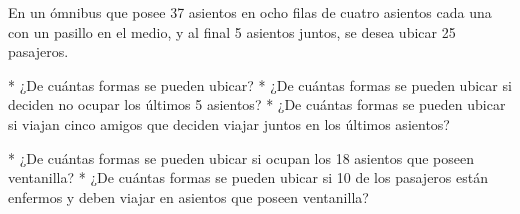 \documentclass[]{presentacion}
\begin{document}
\begin{frame}[allowframebreaks]

\begin{problema}[1]
  En un ómnibus que posee 37 asientos en ocho filas de cuatro
  asientos cada una con un pasillo en el medio, y al final 5 asientos juntos,
  se desea ubicar 25 pasajeros.
  \begin{ejercicios*}
    * ¿De cuántas formas se pueden ubicar?
    * ¿De cuántas formas se pueden ubicar si deciden no ocupar los últimos 5 asientos?
    * ¿De cuántas formas se pueden ubicar si viajan cinco amigos que deciden
    viajar juntos en los últimos asientos?
  \end{ejercicios*}
\end{problema}

\end{frame}

\begin{frame}
\begin{continuacion}
    \begin{ejercicios*}[start=4]
      * ¿De cuántas formas se pueden ubicar si ocupan los 18 asientos que poseen
      ventanilla?
      * ¿De cuántas formas se pueden ubicar si 10 de los pasajeros están enfermos
      y deben viajar en asientos que poseen ventanilla?
    \end{ejercicios*}
\end{continuacion}
\end{frame}
\end{document}
